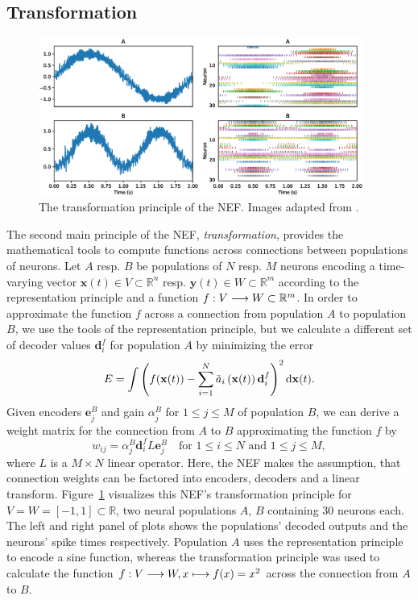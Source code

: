 \subsection{Transformation}
\begin{figure}[t]
	\centering
	\includegraphics[width=0.95\textwidth]{imgs/NEF_transformation.eps}
	\caption{The transformation principle of the \ac{NEF}.
    Images adapted from \textcite{Nengo}.}
	\label{fig:nef_transformation}
\end{figure}
The second main principle of the \ac{NEF}, \emph{transformation}, provides the mathematical tools to compute functions across connections between populations of neurons.
Let $A$ resp. $B$ be populations of $N$ resp. $M$ neurons encoding a time-varying vector $\mathbf{x}(t) \in V \subset \mathbb{R}^{n}$ resp. $\mathbf{y}(t) \in W \subset \mathbb{R}^{m}$ according to the representation principle and a function $f: V \longrightarrow W \subset \mathbb{R}^{m}$.
In order to approximate the function $f$ across a connection from population $A$ to population $B$, we use the tools of the representation principle, but we calculate a different set of decoder values $\mathbf{d}_{i}^{f}$ for population $A$ by minimizing the error
\begin{equation}
\label{eq:nef_transformation}
E = \int \left( f(\mathbf{x}(t)) - \sum_{i=1}^{N} \tilde{a}_{i}\left(\mathbf{x}(t)\right) \mathbf{d}_{i}^{f}\right)^{2} \mathop{}\!\mathrm{d} \mathbf{x}(t).
\end{equation}
Given encoders $\mathbf{e}_{j}^{B}$ and gain $\alpha_{j}^{B}$ for $1 \leq j \leq M$ of population $B$, we can derive a weight matrix for the connection from $A$ to $B$ approximating the function $f$ by
\begin{equation}
w_{ij} = \alpha_{j}^{B} \mathbf{d}_{i}^{f} L \mathbf{e}_{j}^{B} \quad \textrm{for } 1 \leq i \leq N \textrm{ and } 1 \leq j \leq M,
\end{equation}
where $L$ is a $M \times N$ linear operator.
Here, the \ac{NEF} makes the assumption, that connection weights can be factored into encoders, decoders and a linear transform.
Figure~\ref{fig:nef_transformation} visualizes this \ac{NEF}'s transformation principle for $V = W = \left[ -1, 1\right] \subset \mathbb{R}$, two neural populations $A$, $B$ containing $30$ neurons each.
The left and right panel of plots shows the populations' decoded outputs and the neurons' spike times respectively.
Population $A$ uses the representation principle to encode a sine function, whereas the transformation principle was used to calculate the function $f: V \longrightarrow W, x \longmapsto f(x)=x^{2}$ across the connection from $A$ to $B$.

